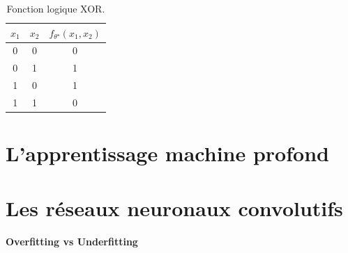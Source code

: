 \begin{table}[H]
        \centering
        \begin{tabular}{ccc}
                $x_1$ & $x_2$ & $f_{\theta^{\star}}(x_1, x_2)$  \\\hline
                0 & 0 & 0 \\ 
                0 & 1 & 1 \\
                1 & 0 & 1 \\
                1 & 1 & 0 \\\hline
        \end{tabular}
        \caption{Fonction logique XOR.}
        \label{tab:xor}
\end{table}




\section{L'apprentissage machine profond}\label{sec:app profond}

\section{Les réseaux neuronaux convolutifs}\label{sec:cnn}

\paragraph{Overfitting vs Underfitting}

